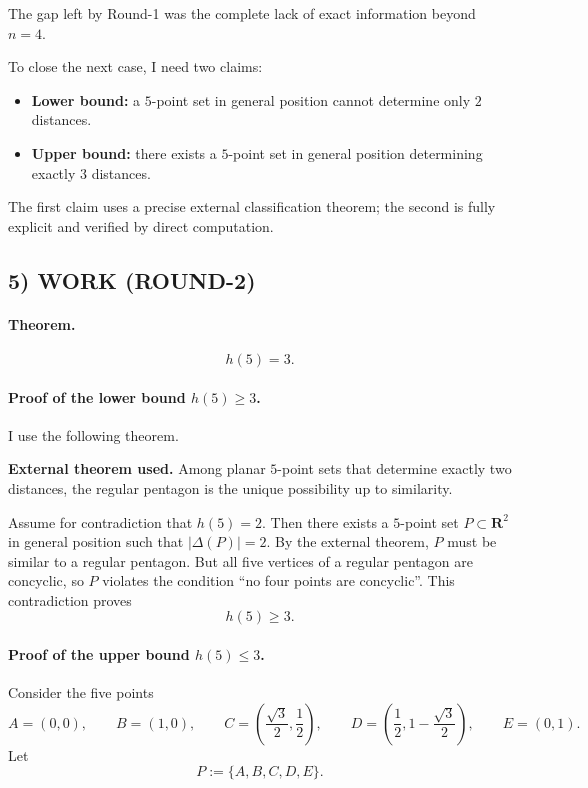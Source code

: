 The gap left by Round-1 was the complete lack of exact information beyond $n=4$.

To close the next case, I need two claims:

\begin{itemize}
\item \textbf{Lower bound:} a $5$-point set in general position cannot determine only $2$ distances.
\item \textbf{Upper bound:} there exists a $5$-point set in general position determining exactly $3$ distances.
\end{itemize}

The first claim uses a precise external classification theorem; the second is fully explicit and verified by direct computation.

\subsection*{5) WORK (ROUND-2)}

\paragraph{Theorem.}
\[
h(5)=3.
\]

\paragraph{Proof of the lower bound $h(5)\ge 3$.}
I use the following theorem.

\medskip

\textbf{External theorem used.}
Among planar $5$-point sets that determine exactly two distances, the regular pentagon is the unique possibility up to similarity.

\medskip

Assume for contradiction that $h(5)=2$.
Then there exists a $5$-point set $P\subset \mathbf{R}^2$ in general position such that $|\Delta(P)|=2$.
By the external theorem, $P$ must be similar to a regular pentagon.
But all five vertices of a regular pentagon are concyclic, so $P$ violates the condition ``no four points are concyclic''.
This contradiction proves
\[
h(5)\ge 3.
\]

\paragraph{Proof of the upper bound $h(5)\le 3$.}
Consider the five points
\[
A=(0,0),\qquad
B=(1,0),\qquad
C=\left(\frac{\sqrt3}{2},\frac12\right),\qquad
D=\left(\frac12,1-\frac{\sqrt3}{2}\right),\qquad
E=(0,1).
\]
Let
\[
P:=\{A,B,C,D,E\}.
\]

